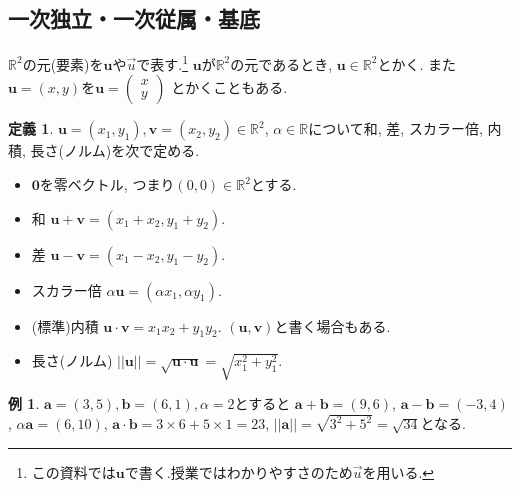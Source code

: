 \documentclass[dvipdfmx,a4paper,11pt]{article}
\newcommand{\R}{\mathbb{R}}
\theoremstyle{definition}
\newtheorem{dfn}[thm]{定義}
\newtheorem{exa}[thm]{例}
\begin{document}
\subsection{一次独立・一次従属・基底}
$\R^2$の元(要素)を$\bm{u}$や$\overset{\to}{u}$で表す.\footnote{この資料では$\bm{u}$で書く.授業ではわかりやすさのため$\overset{\to}{u}$を用いる. }
$\bm{u}$が$\R^2$の元であるとき, $\bm{u} \in \R^2$とかく.
また$\bm{u} = (x, y)$を$\bm{u} =   
\begin{pmatrix}
x \\
 y
 \end{pmatrix} $
 とかくこともある. 

\begin{tcolorbox}[
    colback = white,
    colframe = green!35!black,
    fonttitle = \bfseries,
    breakable = true]
    \begin{dfn}
$\bm{u}=(x_1, y_1), \bm{v}=(x_2, y_2)\in \R^2$, $\alpha \in \R$について和, 差, スカラー倍, 内積, 長さ(ノルム)を次で定める.
\begin{itemize}
	\setlength{\parskip}{0cm}
  	\setlength{\itemsep}{0pt} 
\item $\bm{0}$を零ベクトル, つまり$(0,0) \in \R^2$とする.
\item 和 $\bm{u} + \bm{v} = (x_1 + x_2, y_1+ y_2)$.
\item 差 $\bm{u} - \bm{v} = (x_1 - x_2, y_1 - y_2)$.
\item スカラー倍 $\alpha \bm{u} = (\alpha x_1, \alpha y_1)$.
\item (標準)内積 $\bm{u} \cdot\bm{v} = x_1 x_2 +  y_1 y_2 $. $(\bm{u}, \bm{v})$と書く場合もある. 
\item 長さ(ノルム) $||\bm{u}||= \sqrt{\bm{u} \cdot\bm{u}} = \sqrt{x_{1}^2 +  y_{1}^{2} }$.
\end{itemize}
    \end{dfn}
 \end{tcolorbox}
 
 \begin{exa}
$\bm{a}=(3,5), \bm{b} = (6,1), \alpha=2$とすると
$\bm{a} + \bm{b} =(9,6)$, $\bm{a} - \bm{b} =(-3,4)$, $\alpha \bm{a}= (6,10)$, 
$\bm{a} \cdot\bm{b} = 3 \times 6 + 5 \times 1 =23$, $||\bm{a}||=\sqrt{3^2 + 5^2}= \sqrt{34}$となる.
\end{exa}
\end{document}
